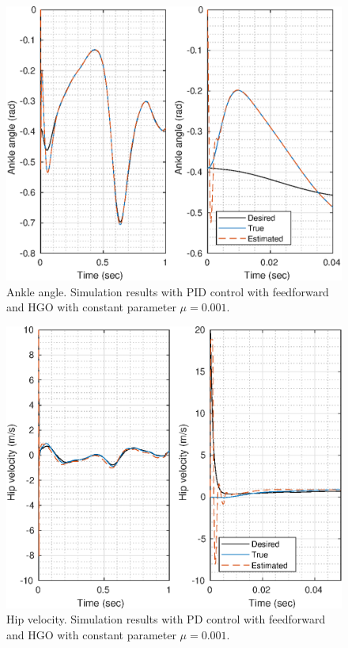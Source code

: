 \documentclass[letterpaper, 10 pt, conference]{ieeeconf}  %
\theoremstyle{plain}
\theoremstyle{definition}
\theoremstyle{remark}
\begin{document}
%
\begin{figure}[h!]
	\begin{center}
	\includegraphics[width = 13cm]{Figs/q_ankle_mu_1e-03.eps}
	\caption{Ankle angle. Simulation results with PID control with feedforward and HGO with constant parameter $\mu=0.001$.}
	\label{fig:ankle}
	\end{center}
	\end{figure}
%
\begin{figure}[h!]
\begin{center}
\includegraphics[width = 13cm]{Figs/dq_hip_mu_1e-03.eps}
\caption{Hip velocity. Simulation results with PD control with feedforward and HGO with constant parameter $\mu=0.001$.}
\label{fig:dhip}
\end{center}
\end{figure}
\end{document}
